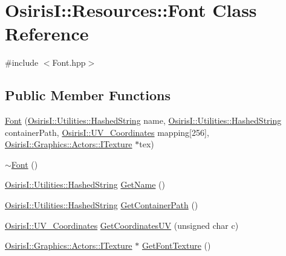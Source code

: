 \hypertarget{class_osiris_i_1_1_resources_1_1_font}{\section{Osiris\-I\-:\-:Resources\-:\-:Font Class Reference}
\label{class_osiris_i_1_1_resources_1_1_font}
}


{\ttfamily \#include $<$Font.\-hpp$>$}

\subsection*{Public Member Functions}
\begin{DoxyCompactItemize}
\item 
\hyperlink{class_osiris_i_1_1_resources_1_1_font_a20714f51d60c4254eca547439b31bedf}{Font} (\hyperlink{class_osiris_i_1_1_utilities_1_1_hashed_string}{Osiris\-I\-::\-Utilities\-::\-Hashed\-String} name, \hyperlink{class_osiris_i_1_1_utilities_1_1_hashed_string}{Osiris\-I\-::\-Utilities\-::\-Hashed\-String} container\-Path, \hyperlink{struct_osiris_i_1_1_u_v___coordinates}{Osiris\-I\-::\-U\-V\-\_\-\-Coordinates} mapping\mbox{[}256\mbox{]}, \hyperlink{class_osiris_i_1_1_graphics_1_1_actors_1_1_i_texture}{Osiris\-I\-::\-Graphics\-::\-Actors\-::\-I\-Texture} $\ast$tex)
\item 
\hyperlink{class_osiris_i_1_1_resources_1_1_font_a9156a914bd7951d25b4edc6f275c6e16}{$\sim$\-Font} ()
\item 
\hyperlink{class_osiris_i_1_1_utilities_1_1_hashed_string}{Osiris\-I\-::\-Utilities\-::\-Hashed\-String} \hyperlink{class_osiris_i_1_1_resources_1_1_font_a188c8a1c2d89d0a1375aad8f1797a2ee}{Get\-Name} ()
\item 
\hyperlink{class_osiris_i_1_1_utilities_1_1_hashed_string}{Osiris\-I\-::\-Utilities\-::\-Hashed\-String} \hyperlink{class_osiris_i_1_1_resources_1_1_font_a0df5d6ce7b3e72b81c11492a7db8b42c}{Get\-Container\-Path} ()
\item 
\hyperlink{struct_osiris_i_1_1_u_v___coordinates}{Osiris\-I\-::\-U\-V\-\_\-\-Coordinates} \hyperlink{class_osiris_i_1_1_resources_1_1_font_afca6342bca8f9f4b698e102dade5c9f0}{Get\-Coordinates\-U\-V} (unsigned char c)
\item 
\hyperlink{class_osiris_i_1_1_graphics_1_1_actors_1_1_i_texture}{Osiris\-I\-::\-Graphics\-::\-Actors\-::\-I\-Texture} $\ast$ \hyperlink{class_osiris_i_1_1_resources_1_1_font_a6df03ee9e7a46c9d63fab0e8fa7a6d0a}{Get\-Font\-Texture} ()

\end{DoxyCompactItemize}
